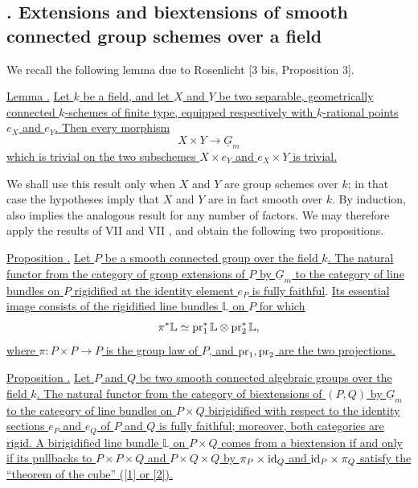 
\subsection*{. Extensions and biextensions of smooth connected group
schemes over a field}

We recall the following lemma due to Rosenlicht [3 bis, Proposition
3].

\medskip
\noindent\underline{Lemma .}  \underline{Let $k$ be a field, and
let $X$ and $Y$ be two separable, geometrically connected $k$-schemes
of finite type, equipped respectively with $k$-rational points $e_X$
and $e_Y$.  Then every morphism}
\[
 X\times Y\longrightarrow\underline G_m
\]
\underline{which is trivial on the two subschemes $X\times e_Y$ and
$e_X\times Y$ is trivial.}

We shall use this result only when $X$ and $Y$ are group schemes over
$k$; in that case the hypotheses imply that $X$ and $Y$ are in fact
smooth over $k$.  By induction,  also implies the analogous result
for any number of factors.  We may therefore apply the results of VII
 and VII , and obtain the following two propositions.

\medskip
\noindent\underline{Proposition .}  \underline{Let $P$ be a
smooth connected group over the field $k$.  The natural functor from
the category of group extensions of $P$ by $\underline G_m$ to the
category of line bundles on $P$ rigidified at the identity element
$e_P$ is fully faithful}.  \underline{Its essential image consists of the
rigidified line bundles $\mathbb L$ on $P$ for which}
\[
 \pi^*\mathbb L\simeq
 \operatorname{pr}_1^*\mathbb L\otimes\operatorname{pr}_2^*\mathbb L,
\]
\underline{where $\pi:P\times P\longrightarrow P$ is the group law
of $P$, and $\operatorname{pr}_1,\operatorname{pr}_2$ are the two projections.}

\medskip
\noindent\underline{Proposition .}  \underline{Let $P$ and $Q$ be
two smooth connected algebraic groups over the field $k$.  The
natural functor from the category of biextensions of $(P,Q)$ by
$\underline G_m$ to the category of line bundles on $P\times Q$
birigidified with respect to the identity sections $e_P$ and $e_Q$ of
$P$ and $Q$ is fully faithful; moreover, both categories are rigid.
A birigidified line bundle $\mathbb L$ on $P\times Q$ comes from a
biextension if and only if its pullbacks to $P\times P\times Q$ and
$P\times Q\times Q$ by $\pi_P\times\mathrm{id}_Q$ and
$\mathrm{id}_P\times\pi_Q$ satisfy the ``theorem of the cube'' ([1] or
[2]).}

